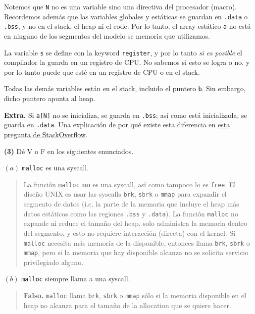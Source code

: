 \documentclass[12pt]{article}
\theoremstyle{definition}
\begin{document}
Notemos que \texttt{N} no es una variable sino una directiva del procesador
(macro). Recordemos además que las variables globales y estáticas se guardan en
\texttt{.data} o \texttt{.bss}, y no en el stack, el heap ni el code. Por lo
tanto, el array estático \texttt{a} no está en ninguno de los segmentos del
modelo se memoria que utilizamos.

La variable \texttt{s} se define con la keyword \texttt{register}, y por lo
tanto \textit{si es posible} el compilador la guarda en un registro de CPU. No
sabemos si esto se logra o no, y por lo tanto puede que esté en un registro de
CPU o en el stack.

Todas las demás variables están en el stack, incluido el puntero \texttt{b}. Sin
embargo, dicho puntero apunta al heap.

\textbf{Extra.} Si \texttt{a[N]} no se inicializa, se guarda en \texttt{.bss};
así como está inicializada, se guarda en \texttt{.data}. Una explicación de por
qué existe esta diferencia en
\href{https://stackoverflow.com/questions/9535250/why-is-the-bss-segment-required}{esta
pregunta de StackOverflow}.


\pagebreak 

\begin{shaded}
    \textbf{(3)} Dé V o F en los siguientes enunciados.
\end{shaded}

$(a)$ \texttt{malloc} es una syscall.


\small
\begin{quote}

La función \texttt{malloc} \textbf{no} es una syscall, así como tampoco lo es
\texttt{free}. El diseño UNIX es usar las syscalls \texttt{brk}, \texttt{sbrk} o
\texttt{mmap} para expandir el segmento de datos (i.e. la parte de la memoria
que incluye el heap más datos estáticos como las regiones \texttt{.bss} y
\texttt{.data}). La función \texttt{malloc} no expande ni reduce el tamaño del
heap, solo administra la memoria dentro del segmento, y esto no requiere
interacción (directa) con el kernel. Si \texttt{malloc} necesita más memoria de
la disponible, entonces llama \texttt{brk}, \texttt{sbrk} o \texttt{mmap}, pero
si la memoria que hay disponible alcanza no se solicita servicio privilegiado
alguno.

\end{quote}
\normalsize

$(b)$ \texttt{malloc} siempre llama a una syscall. 


\small
\begin{quote}

\textbf{Falso.} \texttt{malloc} llama \texttt{brk}, \texttt{sbrk} o
\texttt{mmap} sólo si la memoria disponible en el heap no alcanza para el tamaño
de la allocation que se quiere hacer.

\end{quote}
\normalsize
\end{document}
